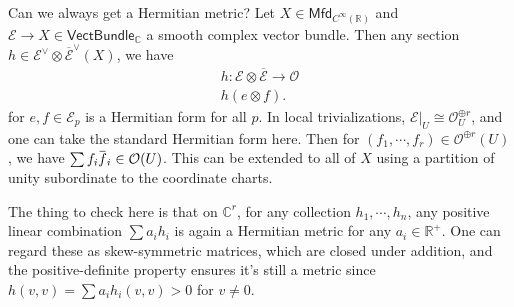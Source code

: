 \begin{remark}

Can we always get a Hermitian metric? Let
\(X \in {\mathsf{Mfd}}_{C^{\infty }({\mathbb{R}})}\) and
\(\mathcal{E} \to X \in {\mathsf{VectBundle}}_{{\mathbb{C}}}\) a smooth
complex vector bundle. Then any section
\(h\in \mathcal{E}^\vee\otimes{\overline{{\mathcal{E}}}}^\vee(X)\), we
have
\begin{align*}
h: \mathcal{E} \otimes{\overline{{\mathcal{E}}}} \to {\mathcal{O}}\\
h( e\otimes f) 
.\end{align*}
for \(e, f \in \mathcal{E}_p\) is a Hermitian form for all \(p\). In
local trivializations,
\({ \left.{{\mathcal{E}}} \right|_{{U}} } \cong {\mathcal{O}}_U^{\oplus r}\),
and one can take the standard Hermitian form here. Then for
\((f_1, \cdots, f_r) \in {\mathcal{O}}^{\oplus r}(U)\), we have
\(\sum f_i \mkern 1.5mu\overline{\mkern-1.5muf\mkern-1.5mu}\mkern 1.5mu_i\in {\mathcal{O}}(U)\).
This can be extended to all of \(X\) using a partition of unity
subordinate to the coordinate charts.

The thing to check here is that on \({\mathbb{C}}^r\), for any
collection \(h_1, \cdots, h_n\), any positive linear combination
\(\sum a_i h_i\) is again a Hermitian metric for any
\(a_i \in {\mathbb{R}}^+\). One can regard these as skew-symmetric
matrices, which are closed under addition, and the positive-definite
property ensures it's still a metric since
\(h(v, v) = \sum a_i h_i(v, v) > 0\) for \(v\neq 0\).

\end{remark}

